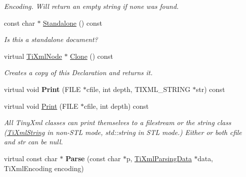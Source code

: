 \begin{DoxyCompactItemize}
\begin{DoxyCompactList}\small\item\em Encoding. Will return an empty string if none was found. \end{DoxyCompactList}\item 
const char $\ast$ \hyperlink{class_ti_xml_declaration_a9ff06afc033d7ef730ec7c6825b97ad9}{Standalone} () const \hypertarget{class_ti_xml_declaration_a9ff06afc033d7ef730ec7c6825b97ad9}{}\label{class_ti_xml_declaration_a9ff06afc033d7ef730ec7c6825b97ad9}

\begin{DoxyCompactList}\small\item\em Is this a standalone document? \end{DoxyCompactList}\item 
virtual \hyperlink{class_ti_xml_node}{Ti\+Xml\+Node} $\ast$ \hyperlink{class_ti_xml_declaration_aff8231266d735943d8a7514a9c9822b9}{Clone} () const \hypertarget{class_ti_xml_declaration_aff8231266d735943d8a7514a9c9822b9}{}\label{class_ti_xml_declaration_aff8231266d735943d8a7514a9c9822b9}

\begin{DoxyCompactList}\small\item\em Creates a copy of this Declaration and returns it. \end{DoxyCompactList}\item 
virtual void {\bfseries Print} (F\+I\+LE $\ast$cfile, int depth, T\+I\+X\+M\+L\+\_\+\+S\+T\+R\+I\+NG $\ast$str) const \hypertarget{class_ti_xml_declaration_aa5ab32ec19d4eeecff4a9238c6c90565}{}\label{class_ti_xml_declaration_aa5ab32ec19d4eeecff4a9238c6c90565}

\item 
virtual void \hyperlink{class_ti_xml_declaration_abf6303db4bd05b5be554036817ff1cb4}{Print} (F\+I\+LE $\ast$cfile, int depth) const 
\begin{DoxyCompactList}\small\item\em All Tiny\+Xml classes can print themselves to a filestream or the string class (\hyperlink{class_ti_xml_string}{Ti\+Xml\+String} in non-\/\+S\+TL mode, std\+::string in S\+TL mode.) Either or both cfile and str can be null. \end{DoxyCompactList}\item 
virtual const char $\ast$ {\bfseries Parse} (const char $\ast$p, \hyperlink{class_ti_xml_parsing_data}{Ti\+Xml\+Parsing\+Data} $\ast$data, Ti\+Xml\+Encoding encoding)\hypertarget{class_ti_xml_declaration_a9839ea97ed687a2b7342fd7b0f04361b}{}\label{class_ti_xml_declaration_a9839ea97ed687a2b7342fd7b0f04361b}


\end{DoxyCompactItemize}
